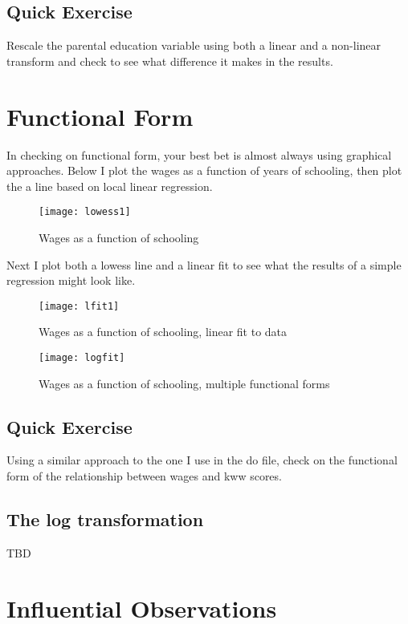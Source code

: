\documentclass[12pt]{article}
\begin{document}
\subsection{Quick Exercise}

Rescale the parental education variable using both a linear and a
non-linear transform and check to see what
difference it makes in the results. 

\section{Functional Form}
\label{sec:functional-form}

In checking on functional form, your best bet is almost always using
graphical approaches. Below I plot the wages as a function of years of
schooling, then plot the a line based on local linear regression. 

\begin{figure}[ht!]
  \centering
  \caption{Wages as a function of schooling}
  \texttt{[image: lowess1]}
  \label{fig:lowess1}
\end{figure}

Next I plot both a lowess line and a linear fit to see what the
results of a simple regression might look like. 

\begin{figure}[ht!]
  \centering
  \caption{Wages as a function of schooling, linear fit to data}
\texttt{[image: lfit1]}
  \label{fig:lfit}
\end{figure}


\begin{figure}[ht!]
  \centering
  \caption{Wages as a function of schooling, multiple functional forms}
  \texttt{[image: logfit]}
  \label{fig:mutlfit}
\end{figure}
\subsection{Quick Exercise}
Using a similar approach to the one I use in the do file, check on the
functional form of the relationship between wages and kww scores. 

\subsection{The log transformation}
\label{sec:log-transformation}

TBD

\section{Influential Observations}
\label{sec:infl-observ}
\end{document}

